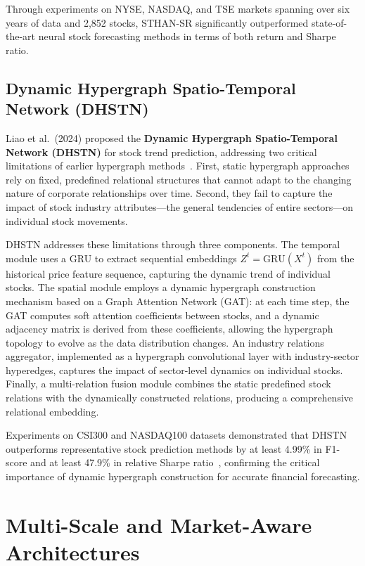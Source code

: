 \documentclass[a4paper,11pt]{report}
\begin{document}
Through experiments on NYSE, NASDAQ, and TSE markets spanning over six years of data and 2,852 stocks, STHAN-SR significantly outperformed state-of-the-art neural stock forecasting methods in terms of both return and Sharpe ratio.
\subsection{Dynamic Hypergraph Spatio-Temporal Network (DHSTN)}

Liao et al.\ (2024) proposed the \textbf{Dynamic Hypergraph Spatio-Temporal Network (DHSTN)} for stock trend prediction, addressing two critical limitations of earlier hypergraph methods~\cite{liao2024dhstn}. First, static hypergraph approaches rely on fixed, predefined relational structures that cannot adapt to the changing nature of corporate relationships over time. Second, they fail to capture the impact of stock industry attributes---the general tendencies of entire sectors---on individual stock movements.

DHSTN addresses these limitations through three components. The temporal module uses a GRU to extract sequential embeddings $Z^t = \text{GRU}(X^t)$ from the historical price feature sequence, capturing the dynamic trend of individual stocks. The spatial module employs a dynamic hypergraph construction mechanism based on a Graph Attention Network (GAT): at each time step, the GAT computes soft attention coefficients between stocks, and a dynamic adjacency matrix is derived from these coefficients, allowing the hypergraph topology to evolve as the data distribution changes. An industry relations aggregator, implemented as a hypergraph convolutional layer with industry-sector hyperedges, captures the impact of sector-level dynamics on individual stocks. Finally, a multi-relation fusion module combines the static predefined stock relations with the dynamically constructed relations, producing a comprehensive relational embedding.

Experiments on CSI300 and NASDAQ100 datasets demonstrated that DHSTN outperforms representative stock prediction methods by at least 4.99\% in F1-score and at least 47.9\% in relative Sharpe ratio~\cite{liao2024dhstn}, confirming the critical importance of dynamic hypergraph construction for accurate financial forecasting.

\section{Multi-Scale and Market-Aware Architectures}
\label{sec:multiscale}
\end{document}
